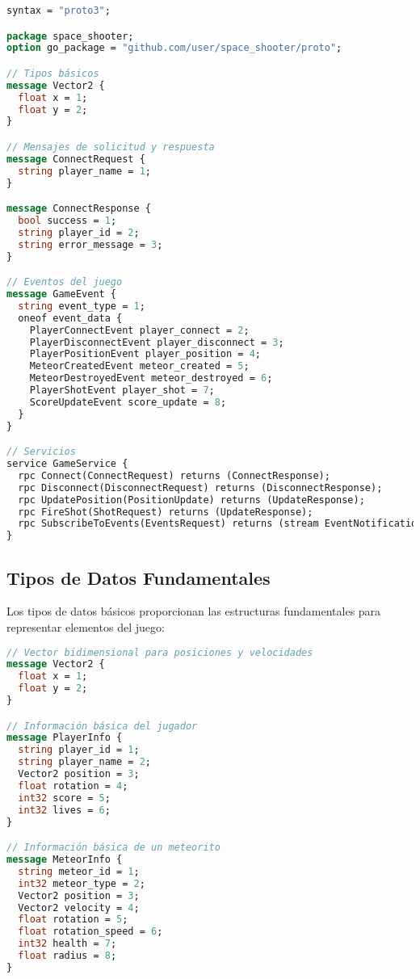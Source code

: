 \documentclass[12pt,letterpaper]{article}
\begin{document}
\begin{lstlisting}[language=proto, caption=Estructura del archivo game.proto]
syntax = "proto3";

package space_shooter;
option go_package = "github.com/user/space_shooter/proto";

// Tipos básicos
message Vector2 {
  float x = 1;
  float y = 2;
}

// Mensajes de solicitud y respuesta
message ConnectRequest {
  string player_name = 1;
}

message ConnectResponse {
  bool success = 1;
  string player_id = 2;
  string error_message = 3;
}

// Eventos del juego
message GameEvent {
  string event_type = 1;
  oneof event_data {
    PlayerConnectEvent player_connect = 2;
    PlayerDisconnectEvent player_disconnect = 3;
    PlayerPositionEvent player_position = 4;
    MeteorCreatedEvent meteor_created = 5;
    MeteorDestroyedEvent meteor_destroyed = 6;
    PlayerShotEvent player_shot = 7;
    ScoreUpdateEvent score_update = 8;
  }
}

// Servicios
service GameService {
  rpc Connect(ConnectRequest) returns (ConnectResponse);
  rpc Disconnect(DisconnectRequest) returns (DisconnectResponse);
  rpc UpdatePosition(PositionUpdate) returns (UpdateResponse);
  rpc FireShot(ShotRequest) returns (UpdateResponse);
  rpc SubscribeToEvents(EventsRequest) returns (stream EventNotification);
}
\end{lstlisting}

\subsection{Tipos de Datos Fundamentales}

Los tipos de datos básicos proporcionan las estructuras fundamentales para representar elementos del juego:

\begin{lstlisting}[language=proto, caption=Definición de tipos básicos]
// Vector bidimensional para posiciones y velocidades
message Vector2 {
  float x = 1;
  float y = 2;
}

// Información básica del jugador
message PlayerInfo {
  string player_id = 1;
  string player_name = 2;
  Vector2 position = 3;
  float rotation = 4;
  int32 score = 5;
  int32 lives = 6;
}

// Información básica de un meteorito
message MeteorInfo {
  string meteor_id = 1;
  int32 meteor_type = 2;
  Vector2 position = 3;
  Vector2 velocity = 4;
  float rotation = 5;
  float rotation_speed = 6;
  int32 health = 7;
  float radius = 8;
}
\end{lstlisting}
\end{document}
